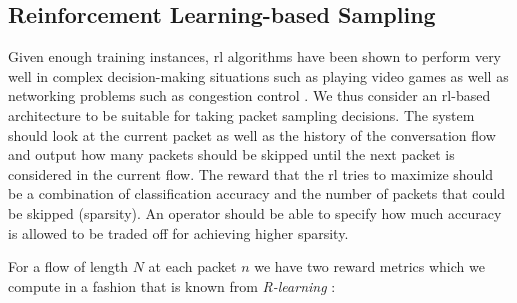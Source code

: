 \documentclass[conference]{IEEEtran}
\begin{document}
\subsection{Reinforcement Learning-based Sampling}
\label{subsec:rlForSampling}

Given enough training instances, \gls{rl} algorithms have been shown to perform very well in complex decision-making situations such as playing video games \cite{mnih_playing_2013} as well as networking problems such as congestion control \cite{bachl_rax_2019}. We thus consider an \gls{rl}-based architecture to be suitable for taking packet sampling decisions. The system should look at the current packet as well as the history of the conversation flow and output how many packets should be skipped until the next packet is considered in the current flow. The reward that the \gls{rl} tries to maximize should be a combination of classification accuracy and the number of packets that could be skipped (sparsity). An operator should be able to specify how much accuracy is allowed to be traded off for achieving higher sparsity.%


For a flow of length $N$ at each packet $n$ we have two reward metrics which we compute in a fashion that is known from \textit{R-learning} \cite{schwartz_reinforcement_1993}:

\end{document}
